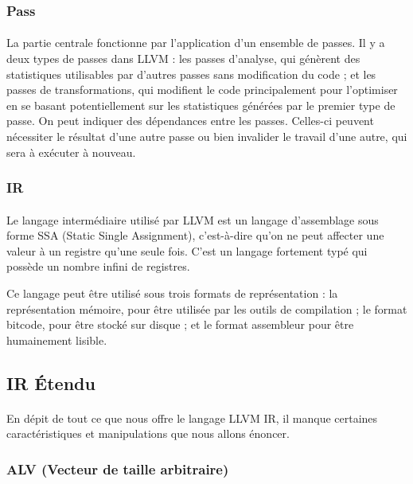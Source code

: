 \subsubsection{Pass}
\paragraph{}
La partie centrale fonctionne par l'application d’un ensemble de passes. Il y a
deux types de passes dans LLVM : les passes d’analyse, qui génèrent des
statistiques utilisables par d’autres passes sans modification du code ; et les
passes de transformations, qui modifient le code principalement pour l'optimiser
en se basant potentiellement sur les statistiques générées par le premier type
de passe. On peut indiquer des dépendances entre les passes. Celles-ci peuvent
nécessiter le résultat d’une autre passe ou bien invalider le travail d’une
autre, qui sera à exécuter à nouveau.

\subsubsection{IR}
\paragraph{}
Le langage intermédiaire utilisé par LLVM est un langage d'assemblage sous forme
SSA (Static Single Assignment), c'est-à-dire qu'on ne peut affecter une valeur à
un registre qu'une seule fois. C'est un langage fortement typé qui possède un
nombre infini de registres.

Ce langage peut être utilisé sous trois formats de représentation : la
représentation mémoire, pour être utilisée par les outils de compilation ; le
format bitcode, pour être stocké sur disque ; et le format assembleur pour être
humainement lisible.

\subsection{IR Étendu}
\paragraph{}
En dépit de tout ce que nous offre le langage LLVM IR, il manque certaines
caractéristiques et manipulations que nous allons énoncer.

\subsubsection{ALV (Vecteur de taille arbitraire)}
